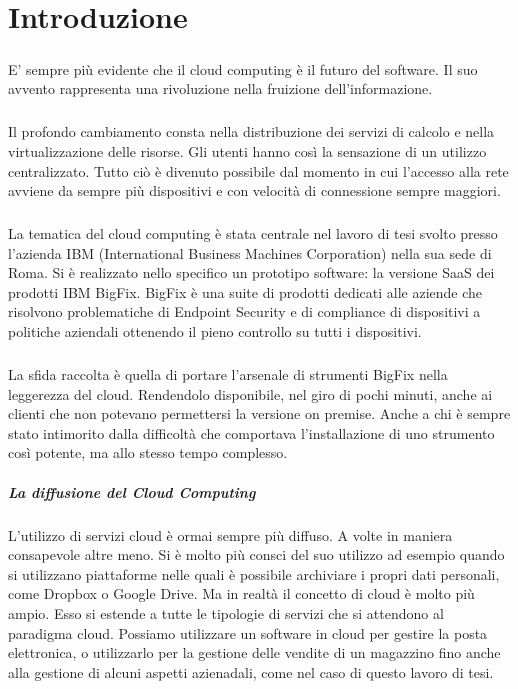 \chapter{Introduzione}

\paragraph{}
E' sempre più evidente che il cloud computing è il futuro del software. Il suo avvento rappresenta una rivoluzione nella fruizione dell'informazione.
\paragraph{}
Il profondo cambiamento consta nella distribuzione dei servizi di calcolo e nella virtualizzazione delle risorse. Gli utenti hanno così la sensazione di un utilizzo centralizzato. Tutto ciò è divenuto possibile dal momento in cui l'accesso alla rete avviene da sempre più dispositivi e con velocità di connessione sempre maggiori.
\paragraph{}
La tematica del cloud computing è stata centrale nel lavoro di tesi svolto presso l'azienda IBM (International Business Machines Corporation) nella sua sede di Roma. Si è realizzato nello specifico un prototipo software: la versione SaaS dei prodotti IBM BigFix. BigFix è una suite di prodotti dedicati alle aziende che risolvono problematiche di Endpoint Security e di compliance di dispositivi a politiche aziendali ottenendo il pieno controllo su tutti i dispositivi.
\paragraph{}
La sfida raccolta è quella di portare l'arsenale di strumenti BigFix nella leggerezza del cloud. Rendendolo disponibile, nel giro di pochi minuti, anche ai clienti che non potevano permettersi la versione on premise. Anche a chi è sempre stato intimorito dalla difficoltà che comportava l'installazione di uno strumento così potente, ma allo stesso tempo complesso.

\paragraph{La diffusione del Cloud Computing}
L'utilizzo di servizi cloud è ormai sempre più diffuso. A volte in maniera consapevole altre meno. Si è molto più consci del suo utilizzo ad esempio quando si utilizzano piattaforme nelle quali è possibile archiviare i propri dati personali, come Dropbox o Google Drive. Ma in realtà il concetto di cloud è molto più ampio. Esso si estende a tutte le tipologie di servizi che si attendono al paradigma cloud. Possiamo utilizzare un software in cloud per gestire la posta elettronica, o utilizzarlo per la gestione delle vendite di un magazzino fino anche alla gestione di alcuni aspetti azienadali, come nel caso di questo lavoro di tesi.
